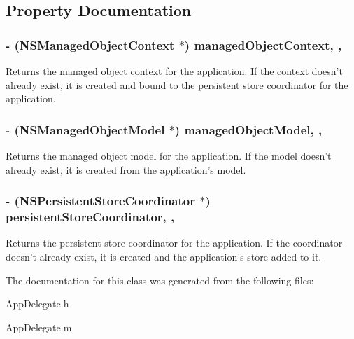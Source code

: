 \subsection{Property Documentation}
\hypertarget{interface_app_delegate_a1fa650ded1ca9bb0eecda69d1f41cc1f}{
\subsubsection[{managed\-Object\-Context}]{\setlength{\rightskip}{0pt plus 5cm}-\/ (N\-S\-Managed\-Object\-Context $\ast$) managed\-Object\-Context\hspace{0.3cm}{\ttfamily [read]}, {\ttfamily [nonatomic]}, {\ttfamily [strong]}}}\label{interface_app_delegate_a1fa650ded1ca9bb0eecda69d1f41cc1f}
Returns the managed object context for the application. If the context doesn't already exist, it is created and bound to the persistent store coordinator for the application. \hypertarget{interface_app_delegate_a9f3cb4e87e96ee48a07e2b72cf3f6d13}{
\subsubsection[{managed\-Object\-Model}]{\setlength{\rightskip}{0pt plus 5cm}-\/ (N\-S\-Managed\-Object\-Model $\ast$) managed\-Object\-Model\hspace{0.3cm}{\ttfamily [read]}, {\ttfamily [nonatomic]}, {\ttfamily [strong]}}}\label{interface_app_delegate_a9f3cb4e87e96ee48a07e2b72cf3f6d13}
Returns the managed object model for the application. If the model doesn't already exist, it is created from the application's model. \hypertarget{interface_app_delegate_a4169fdb1085cc13479280e10d44c039a}{
\subsubsection[{persistent\-Store\-Coordinator}]{\setlength{\rightskip}{0pt plus 5cm}-\/ (N\-S\-Persistent\-Store\-Coordinator $\ast$) persistent\-Store\-Coordinator\hspace{0.3cm}{\ttfamily [read]}, {\ttfamily [nonatomic]}, {\ttfamily [strong]}}}\label{interface_app_delegate_a4169fdb1085cc13479280e10d44c039a}
Returns the persistent store coordinator for the application. If the coordinator doesn't already exist, it is created and the application's store added to it. 

The documentation for this class was generated from the following files\-:\begin{DoxyCompactItemize}
\item 
App\-Delegate.\-h\item 
App\-Delegate.\-m\end{DoxyCompactItemize}

